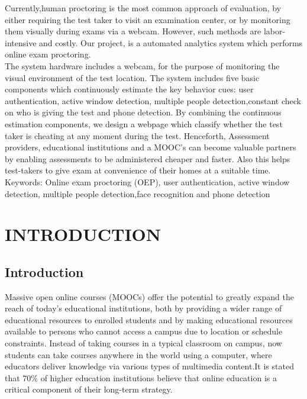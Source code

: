 \documentclass[12pt]{report}
\begin{document}
                            Currently,human proctoring is the most common approach of evaluation, by either requiring the test taker to visit an examination center, or by monitoring them visually during exams via a webcam. However, such methods are labor-intensive and costly. Our project, is a automated analytics system which performs online exam proctoring.\\

					The system hardware includes a webcam, for the purpose of monitoring the visual environment of the test location. The system includes five basic components which continuously estimate the key behavior cues: user authentication, active window detection, multiple people detection,constant check on who is giving the test and phone detection. By combining the continuous estimation components, we design a webpage which classify whether the test taker is cheating at any moment during the test. Henceforth, Assessment providers, educational institutions and a MOOC’s can  become valuable partners by enabling assessments to be administered cheaper and faster. Also this helps test-takers to give exam at convenience of their homes at a suitable time.\\

Keywords: Online exam proctoring (OEP), user authentication, active window detection, multiple people detection,face recognition and phone detection

\pagebreak
\listoftables
\listoffigures
\tableofcontents


\chapter{INTRODUCTION}
\section{ Introduction}
Massive open online courses (MOOCs) offer the potential to greatly expand the reach of today’s educational institutions, both by providing a wider range of educational resources to enrolled students and by making educational resources available to persons who cannot access a campus due to location or schedule constraints. Instead of taking courses in a typical classroom on campus, now students can take courses anywhere in the world using a computer, where educators deliver knowledge via various types of multimedia content.It is stated that 70\% of higher education institutions believe that online education is a critical component of their long-term strategy.\\
\end{document}
